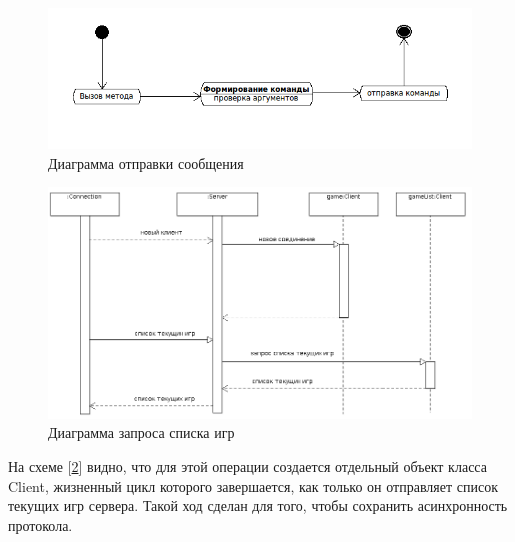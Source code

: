 \begin{figure}[ht]
\centering
\includegraphics[width=18cm]{images/state1.png}
\caption{Диаграмма отправки сообщения}
\label{fig6}
\end{figure}

\begin{figure}[hpt]
\centering
\includegraphics[width=18cm]{images/par2.png}
\caption{Диаграмма запроса списка игр}
\label{fig7}
\end{figure}

На схеме [\ref{fig7}] видно, что для этой операции создается отдельный объект класса Client, жизненный цикл которого завершается, как только он отправляет список текущих игр сервера. Такой ход сделан для того, чтобы сохранить асинхронность протокола.

\endinput
